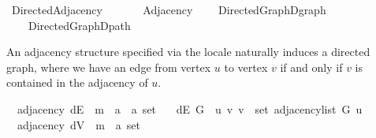 %
\begin{isabellebody}%
%
%
\isadelimdocument
%
\endisadelimdocument
%
\isatagdocument
%
\isamarkuptrue%
%
\endisatagdocument
{\isafolddocument}%
%
\isadelimdocument
%
\endisadelimdocument
%
\isadelimtheory
%
\endisadelimtheory
%
\isatagtheory
{}\isamarkupfalse%
\ Directed{\isacharunderscore}{\kern0pt}Adjacency\isanewline
\ \ \isanewline
\ \ \ \ Adjacency\isanewline
\ \ \ \ {\isachardoublequoteopen}{\isachardot}{\kern0pt}{\isachardot}{\kern0pt}{\isacharslash}{\kern0pt}Directed{\isacharunderscore}{\kern0pt}Graph{\isacharslash}{\kern0pt}Dgraph{\isachardoublequoteclose}\isanewline
\ \ \ \ {\isachardoublequoteopen}{\isachardot}{\kern0pt}{\isachardot}{\kern0pt}{\isacharslash}{\kern0pt}Directed{\isacharunderscore}{\kern0pt}Graph{\isacharslash}{\kern0pt}Dpath{\isachardoublequoteclose}\isanewline
{}%
\endisatagtheory
{\isafoldtheory}%
%
\isadelimtheory
%
\endisadelimtheory
%
\begin{isamarkuptext}%
An adjacency structure specified via the locale  naturally induces a directed
graph, where we have an edge from vertex $u$ to vertex $v$ if and only if $v$ is contained in the
adjacency of $u$.%
\end{isamarkuptext}\isamarkuptrue%
\isamarkupfalse%
\ {\isacharparenleft}{\kern0pt}\ adjacency{\isacharparenright}{\kern0pt}\ dE\ {\isacharcolon}{\kern0pt}{\isacharcolon}{\kern0pt}\ {\isachardoublequoteopen}{\isacharprime}{\kern0pt}m\ {\isasymRightarrow}\ {\isacharparenleft}{\kern0pt}{\isacharprime}{\kern0pt}a\ {\isasymtimes}\ {\isacharprime}{\kern0pt}a{\isacharparenright}{\kern0pt}\ set{\isachardoublequoteclose}\ \isanewline
\ \ {\isachardoublequoteopen}dE\ G\ {\isasymequiv}\ {\isacharbraceleft}{\kern0pt}{\isacharparenleft}{\kern0pt}u{\isacharcomma}{\kern0pt}\ v{\isacharparenright}{\kern0pt}{\isachardot}{\kern0pt}\ v\ {\isasymin}\ set\ {\isacharparenleft}{\kern0pt}adjacency{\isacharunderscore}{\kern0pt}list\ G\ u{\isacharparenright}{\kern0pt}{\isacharbraceright}{\kern0pt}{\isachardoublequoteclose}\isanewline
\isanewline
{}\isamarkupfalse%
\ {\isacharparenleft}{\kern0pt}\ adjacency{\isacharparenright}{\kern0pt}\ dV\ {\isacharcolon}{\kern0pt}{\isacharcolon}{\kern0pt}\ {\isachardoublequoteopen}{\isacharprime}{\kern0pt}m\ {\isasymRightarrow}\ {\isacharprime}{\kern0pt}a\ set{\isachardoublequoteclose}\ \isanewline

\end{isabellebody}
